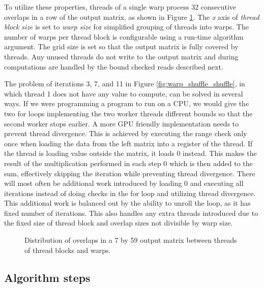 
To utilize these properties, threads of a single warp process 32 consecutive overlaps in a row of the output matrix, as shown in Figure \ref{fig:warp_shuffle_simple_dist}. The \textit{x} axis of \textit{thread block size} is set to \textit{warp size} for simplified grouping of threads into warps. The number of warps per thread block is configurable using a run-time algorithm argument. The grid size is set so that the output matrix is fully covered by threads. Any unused threads do not write to the output matrix and during computations are handled by the bound checked reads described next.

The problem of iterations 3, 7, and 11 in Figure \ref{fig:warp_shuffle_shuffle}, in which thread 1 does not have any value to compute, can be solved in several ways. If we were programming a program to run on a CPU, we would give the two for loops implementing the two worker threads different bounds so that the second worker stops earlier. A more GPU friendly implementation needs to prevent thread divergence. This is achieved by executing the range check only once when loading the data from the left matrix into a register of the thread. If the thread is loading value outside the matrix, it loads 0 instead. This makes the result of the multiplication performed in each step 0 which is then added to the sum, effectively skipping the iteration while preventing thread divergence. There will most often be additional work introduced by loading 0 and executing all iterations instead of doing checks in the for loop and utilizing thread divergence. This additional work is balanced out by the ability to unroll the loop, as it has fixed number of iterations. This also handles any extra threads introduced due to the fixed size of thread block and overlap sizes not divisible by warp size.

\begin{figure}[ht]
	\centering
	\def\svgwidth{0.8\textwidth}
	
	\caption{Distribution of overlaps in a 7 by 59 output matrix between threads of thread blocks and warps.}
	\label{fig:warp_shuffle_simple_dist}
\end{figure}

\subsection{Algorithm steps}
\label{sec:simplified_warp_shuffle_steps}


